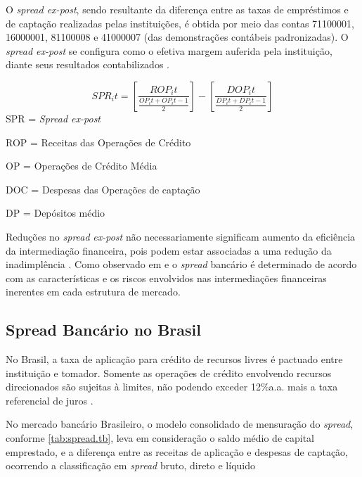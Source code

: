 \documentclass[12pt,openright,oneside,a4paper,chapter=TITLE,section=TITLE,subsection=TITLE,english,french,spanish,portugues,sumario=tradicional]{abntex2}
\begin{document}
O \emph{spread ex-post}, sendo resultante da diferença entre as taxas de empréstimos e de captação realizadas pelas instituições, é obtida por meio das contas 71100001, 16000001, 81100008 e 41000007 (das demonstrações contábeis padronizadas). O \emph{spread ex-post} se configura como o efetiva margem auferida pela instituição, diante seus resultados contabilizados \cite{dantas:2012}.

\[
SPR_it = [\frac{ROP_it}{\frac{OP_it + OP_it-1}{2}}] - [\frac{DOP_it}{\frac{DP_it + DP_it-1}{2}}]
\]
SPR = \emph{Spread ex-post}

ROP = Receitas das Operações de Crédito

OP = Operações de Crédito Média

DOC = Despesas das Operações de captação

DP = Depósitos médio

Reduções no \emph{spread} \emph{ex-post} não necessariamente significam aumento da
eficiência da intermediação financeira, pois podem estar associadas a uma
redução da inadimplência \cite{kunt:1999}. Como observado em
\textcite{klein:1971} e \textcite{ho-saunders:1981} o \emph{spread} bancário é
determinado de acordo com as características e os riscos envolvidos nas
intermediações financeiras inerentes em cada estrutura de mercado.

\subsection{Spread Bancário no Brasil}

No Brasil, a taxa de aplicação para crédito de recursos livres é pactuado entre
instituição e tomador. Somente as operações de crédito envolvendo recursos
direcionados são sujeitas à limites, não podendo exceder 12\%a.a. mais a taxa
referencial de juros \cite{BCB:2016}.

No mercado bancário Brasileiro, o modelo consolidado de mensuração do \emph{spread},
conforme \autoref{tab:spread.tb}, leva em consideração o saldo médio de capital
emprestado, e a diferença entre as receitas de aplicação e despesas de
captação, ocorrendo a classificação em \emph{spread} bruto, direto e líquido
\cite{fipecafi:2005}
\end{document}
